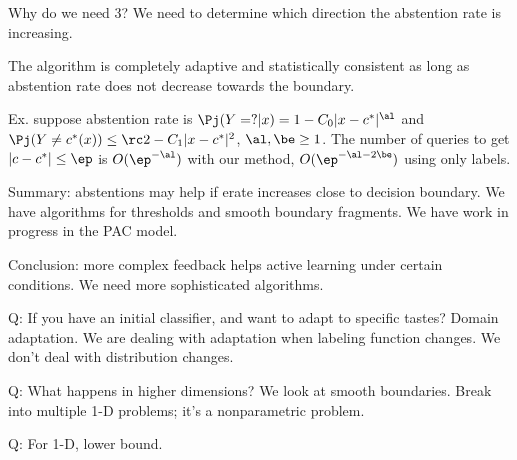 Why do we need 3? We need to determine which direction the abstention rate is increasing.

The algorithm is completely adaptive and statistically consistent as long as abstention rate does not decrease towards the boundary.

Ex. suppose abstention rate is $\Pj(Y=?|x) = 1-C_0 |x-c^*|^\al$ and $\Pj(Y\ne c^*(x)) \le \rc 2-C_1|x-c^*|^2$, $\al,\be\ge 1$. The number of queries to get $|c-c^*|\le \ep$ is $O(\ep^{-\al})$ with our method, $O(\ep^{-\al-2\be})$ using only labels.

Summary: abstentions may help if erate increases close to decision boundary. We have algorithms for thresholds and smooth boundary fragments. We have work in progress in the PAC model.

Conclusion: more complex feedback helps active learning under certain conditions. We need more sophisticated algorithms.

Q: If you have an initial classifier, and want to adapt to specific tastes? Domain adaptation.  We are dealing with adaptation when labeling function changes. We don't deal with distribution changes.

Q: What happens in higher dimensions? We look at smooth boundaries. Break into multiple 1-D problems; it's a nonparametric problem.

Q: For 1-D, lower bound.